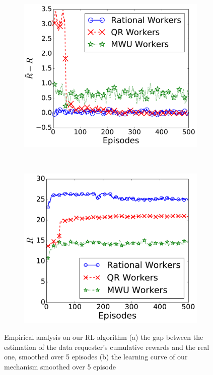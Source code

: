 \begin{figure}[!t]
   \setlength{\abovecaptionskip}{0mm}
    \centering
    \begin{subfigure}[t]{0.24\textwidth}
        \centering
        \includegraphics[width=\textwidth]{image/RIL1}%
		\vspace{-1mm}
        \caption{\label{figure:rewardError}}
    \end{subfigure}%
~
    \begin{subfigure}[t]{0.23\textwidth}
        \centering
        \includegraphics[width=\textwidth]{image/RIL2}%
		\vspace{-1mm}
        \caption{\label{figure:learningCurve}}
    \end{subfigure}
	\vspace{-3mm}
    \caption{\label{figure:learning}Empirical analysis on our RL algorithm (a) the gap between the estimation of the data requester's cumulative rewards and the real one, smoothed over 5 episodes (b) the learning curve of our mechanism smoothed over 5 episode}
	\vspace{-2mm}
\end{figure}
